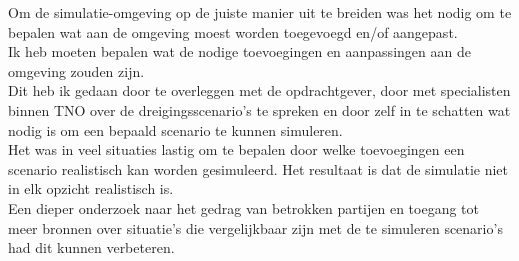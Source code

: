 \documentclass[12pt, letterpaper]{article}
\begin{document}
\begin{appendices}
Om de simulatie-omgeving op de juiste manier uit te breiden was het nodig om te bepalen wat aan de omgeving moest worden toegevoegd en/of aangepast. \\
Ik heb moeten bepalen wat de nodige toevoegingen en aanpassingen aan de omgeving zouden zijn. \\
Dit heb ik gedaan door te overleggen met de opdrachtgever, door met specialisten binnen TNO over de dreigingsscenario's te spreken en door zelf in te schatten wat nodig is om een bepaald scenario te kunnen simuleren. \\
Het was in veel situaties lastig om te bepalen door welke toevoegingen een scenario realistisch kan worden gesimuleerd. Het resultaat is dat de simulatie niet in elk opzicht realistisch is.\\
Een dieper onderzoek naar het gedrag van betrokken partijen en toegang tot meer bronnen over situatie's die vergelijkbaar zijn met de te simuleren scenario's had dit kunnen verbeteren.\\


\end{appendices}
\end{document}
